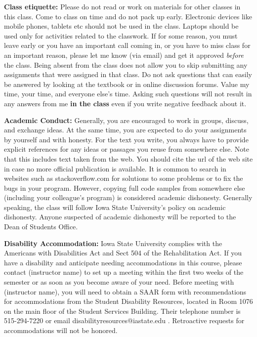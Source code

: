\documentclass[11pt,a4paper]{article}
\begin{document}
\bigskip\textbf{\large Class etiquette: } Please do not read or work on materials for other classes in this class. Come to class on time and
do not pack up early. Electronic devices like mobile phones, tablets etc should not be used in the class. Laptops should be used only for activities related to the classwork. If for some reason, you must leave early or you have an important call coming in, or you have to miss class for an important reason, please let me know (via email) and get it approved \emph{before} the class. Being absent from the class does not allow you to skip submitting any assignments that were assigned in that class. Do not ask questions that can easily be answered by looking at the textbook or in online discussion forums. Value my time, your time, and everyone else's time. Asking such questions will not result in any answers from me \textbf{in the class} even if you write negative feedback about it.  

\bigskip\textbf{\large Academic Conduct:} Generally, you are encouraged to work in groups, discuss, and exchange ideas. At the same time, you are expected to do your assignments by yourself and with honesty. For the text you write, you always have to provide explicit references for
any ideas or passages you reuse from somewhere else. Note that this includes text taken from the web. You should cite the url of the web site in case no more official publication is available. It is common to search in websites such as stackoverflow.com for solutions to some problems or to fix the bugs in your program. However, copying full code samples from somewhere else (including your colleague's program) is considered academic dishonesty. Generally speaking, the class will follow Iowa State University's policy on academic dishonesty. Anyone suspected of academic dishonesty will be reported to the Dean of Students Office. 

\bigskip\textbf{\large Disability Accommodation: }
Iowa State University complies with the Americans with Disabilities Act and Sect 504 of the Rehabilitation Act. If you have a disability and anticipate needing accommodations in this course, please contact (instructor name) to set up a meeting within the first two weeks of the semester or as soon as you become aware of your need.  Before meeting with (instructor name), you will need to obtain a SAAR form with recommendations for accommodations from the Student Disability Resources, located in Room 1076 on the main floor of the Student Services Building. Their telephone number is 515-294-7220 or email disabilityresources@iastate.edu .  Retroactive requests for accommodations will not be honored.
\end{document}
